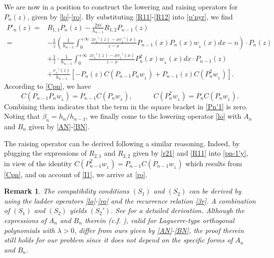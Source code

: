 \documentclass[12pt,a4paper]{article}    %
\newtheorem{remark}{Remark}
\numberwithin{equation}{section}
\begin{document}
We are now in a position to construct the lowering and raising operators for $P_n(z)$, given by \eqref{lo}-\eqref{ro}. By substituting \eqref{R11}-\eqref{R12} into \eqref{p'nyr},  we find
\begin{align}			
P'_n(z)=&R_{1,1}P_n(z)-\frac{2\pi i}{h_{n-1}}R_{1,2}P_{n-1}(z)\nonumber\\
=&-\frac{1}{z}\left(\frac{1}{h_{n-1}}\int_{0}^{+\infty}\frac{zv_{_L}'(z)-xv_{_L}'(x)}{z-x}P_{n-1}(x)P_n(x)w_{_L}(x)dx
			-n\right)\cdot P_n(z)\nonumber\\			 &+\frac{1}{z}\cdot\frac{1}{h_{n-1}}\int_{0}^{+\infty}\frac{zv_{_L}'(z)-xv_{_L}'(x)}{z-x}P_n^{2}(x)w_{_L}(x)dx\cdot P_{n-1}(z)\nonumber\\
&+\frac{v_{_L}'(z)}{h_{n-1}}\left[-P_n(z)C(P_{n-1}P_nw_{_L})+P_{n-1}(z)C(P_n^2w_{_L})\right].\label{Pn'1}
\end{align}	
According to \eqref{Cpn}, we have
\[C(P_{n-1}P_nw_{_L})=P_{n-1}C(P_nw_{_L}),\quad\qquad C(P_n^2w_{_L})=P_nC(P_nw_{_L}). \]
Combining them indicates that the term in the square bracket in \eqref{Pn'1} is zero. Noting that $\beta_n=h_n/h_{n-1}$, we finally come to the lowering operator \eqref{lo} with $A_n$ and $B_n$ given by \eqref{AN}-\eqref{BN}.
	
The raising operator can be derived following a similar reasoning. Indeed, by plugging the expressions of $R_{2,1}$ and $R_{2,2}$ given by \eqref{r21} and \eqref{R11} into \eqref{pn-1'y}, in view of the identity $C(P_{n-1}^2w_{_L})=P_{n-1}C(P_{n-1}w_{_L})$
which results from \eqref{Cpn}, and on account of \eqref{I1}, we arrive at \eqref{ro}.

\begin{remark}\label{lr-r}
The compatibility conditions $(S_1)$ and $(S_2)$ can be derived by using the ladder operators \eqref{lo}-\eqref{ro} and the recurrence relation \eqref{3r}.
A combination of $(S_1)$ and $(S_2)$ yields $(S_2')$. See \cite[Theorem 4.2]{WvA18} for a detailed derivation.
Although the expressions of $A_n$ and $B_n$ therein (c.f. \cite[(4.4)-(4.5)]{WvA18}), valid for Laguerre-type orthogonal polynomials with $\lambda>0$, differ from ours given by \eqref{AN}-\eqref{BN}, the proof therein still holds for our problem since it does not depend on the specific forms of $A_n$ and $B_n$.
\end{remark}
\end{document}
